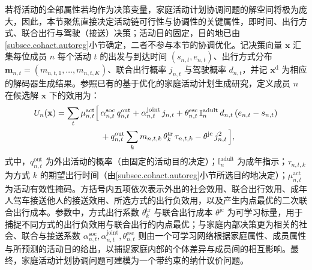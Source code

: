 若将活动的全部属性若均作为决策变量，家庭活动计划协调问题的解空间将极为庞大，因此，本节聚焦直接决定活动链可行性与协调性的关键属性，即时间、出行方式、联合出行与驾驶（接送）决策；活动目的固定，目的地已由\ref{subsec.cohact.autoreg}小节确定，二者不参与本节的协调优化。记决策向量 $\mathbf{x}$ 汇集每位成员 $n$ 每个活动 $t$ 的出发与到达时间 $(s_{n,t},e_{n,t})$、出行方式分布 $\mathbf{m}_{n,t}=(m_{n,t,1},\dots,m_{n,t,K})$、联合出行概率 $j_{n,t}$ 与驾驶概率 $d_{n,t}$，并记 $\mathbf{x}^{\mathrm{d}}$ 为相应的解码器生成结果。参照已有的基于优化的家庭活动计划生成研究\citep{rezvanySimulatingIntrahouseholdInteractions2023}，定义成员 $n$ 在候选解 $\mathbf{x}$ 下的效用为：
\begin{equation}
\begin{aligned}
U_n(\mathbf{x})=\sum_{t}\mu_{n,t}^{\mathrm{act}}\Bigl[\,&\alpha_{n,t}^{\mathrm{soc}}\,q_{n,t}^{\mathrm{out}}
+\alpha_{n,t}^{\mathrm{joint}}\,j_{n,t}
+\theta_{n,t}^{\mathrm{esc}}\,\mathbb{I}_{n}^{\mathrm{adult}}\,d_{n,t}\,(e_{n,t}-s_{n,t})\\
&+q_{n,t}^{\mathrm{out}}\sum_{k}m_{n,t,k}\,\theta_k^{\mathrm{tr}}\,\tau_{n,t,k}
-\theta^{\mathrm{jc}}\,j_{n,t}^{2}\,\Bigr],
\end{aligned}
\label{eq.cohact.utility}
\end{equation}
式中，$q_{n,t}^{\mathrm{out}}$ 为外出活动的概率（由固定的活动目的决定）；$\mathbb{I}_{n}^{\mathrm{adult}}$ 为成年指示；$\tau_{n,t,k}$ 为方式 $k$ 的期望出行时间（由\ref{subsec.cohact.autoreg}小节所选目的地决定）；$\mu_{n,t}^{\mathrm{act}}$ 为活动有效性掩码。方括号内五项依次表示外出的社会效用、联合出行效用、成年人驾车接送他人的接送效用、所选方式的出行负效用，以及产生内点最优的二次联合出行成本。参数中，方式出行系数 $\theta_k^{\mathrm{tr}}$ 与联合出行成本 $\theta^{\mathrm{jc}}$ 为可学习标量，用于捕捉不同方式的出行负效用与联合出行的内点最优；与家庭内部决策更为相关的社会、联合与接送系数 $\alpha_{n,t}^{\mathrm{soc}},\alpha_{n,t}^{\mathrm{joint}},\theta_{n,t}^{\mathrm{esc}}$ 则由一个可学习网络根据家庭属性、成员属性与所预测的活动目的给出，以捕捉家庭内部的个体差异与成员间的相互影响。最终，家庭活动计划协调问题可建模为一个带约束的纳什议价问题。

